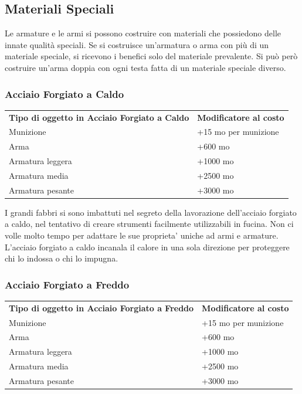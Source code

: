\documentclass[a4paper,11pt,twoside,openany]{book}
\begin{document}
\pagebreak

\subsection{Materiali Speciali}

Le armature e le armi si possono costruire con materiali che possiedono delle innate qualità speciali. Se si costruisce un'armatura o arma con più di un materiale speciale, si ricevono i benefici solo del materiale prevalente. Si può però costruire un'arma doppia con ogni testa fatta di un materiale speciale diverso.

\subsubsection{Acciaio Forgiato a Caldo}

\label{acciaio-forgiato-a-caldo}

\begin{tabular}{ll}
	\toprule
	\textbf{Tipo di oggetto in Acciaio Forgiato a Caldo} & \textbf{Modificatore al costo}\\
	Munizione			& +15 mo per munizione\\
	Arma				& +600 mo\\
	Armatura leggera    & +1000 mo\\
	Armatura media      & +2500 mo\\
	Armatura pesante    & +3000 mo\\
\end{tabular}

I grandi fabbri si sono imbattuti nel segreto della lavorazione dell'acciaio
forgiato a caldo, nel tentativo di creare strumenti facilmente utilizzabili
in fucina. Non ci volle molto tempo per adattare le sue proprieta'
uniche ad armi e armature. L'acciaio forgiato a caldo incanala il
calore in una sola direzione per proteggere chi lo indossa o chi lo
impugna.

\subsubsection{Acciaio Forgiato a Freddo}

\label{acciaio-forgiato-a-freddo}

\begin{tabular}{ll}
	\toprule
	\textbf{Tipo di oggetto in Acciaio Forgiato a Freddo} & \textbf{Modificatore al costo}\\
	Munizione               & +15 mo per munizione\\
	Arma                    & +600 mo\\
	Armatura leggera        & +1000 mo\\
	Armatura media          & +2500 mo\\
	Armatura pesante        & +3000 mo\\
\end{tabular}
\end{document}
